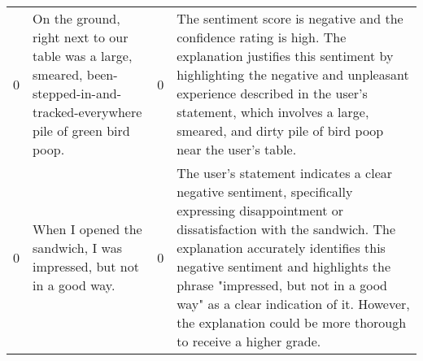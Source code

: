 \begin{tabular}{r{1cm} p{0.4in} r{1cm} p{0.4in}}
0 & On the ground, right next to our table was a large, smeared, been-stepped-in-and-tracked-everywhere pile of green bird poop. & 0 & The sentiment score is negative and the confidence rating is high. The explanation justifies this sentiment by highlighting the negative and unpleasant experience described in the user's statement, which involves a large, smeared, and dirty pile of bird poop near the user's table. \\
0 & When I opened the sandwich, I was impressed, but not in a good way. & 0 & The user's statement indicates a clear negative sentiment, specifically expressing disappointment or dissatisfaction with the sandwich. The explanation accurately identifies this negative sentiment and highlights the phrase "impressed, but not in a good way" as a clear indication of it. However, the explanation could be more thorough to receive a higher grade. \\
\bottomrule
\end{tabular}
